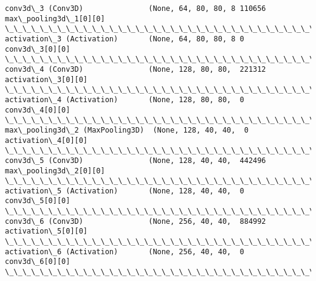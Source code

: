 \documentclass[11pt]{article}
\begin{document}
\begin{Verbatim}[commandchars=\\\{\}]
conv3d\_3 (Conv3D)               (None, 64, 80, 80, 8 110656      max\_pooling3d\_1[0][0]            
\_\_\_\_\_\_\_\_\_\_\_\_\_\_\_\_\_\_\_\_\_\_\_\_\_\_\_\_\_\_\_\_\_\_\_\_\_\_\_\_\_\_\_\_\_\_\_\_\_\_\_\_\_\_\_\_\_\_\_\_\_\_\_\_\_\_\_\_\_\_\_\_\_\_\_\_\_\_\_\_\_\_\_\_\_\_\_\_\_\_\_\_\_\_\_\_\_\_
activation\_3 (Activation)       (None, 64, 80, 80, 8 0           conv3d\_3[0][0]                   
\_\_\_\_\_\_\_\_\_\_\_\_\_\_\_\_\_\_\_\_\_\_\_\_\_\_\_\_\_\_\_\_\_\_\_\_\_\_\_\_\_\_\_\_\_\_\_\_\_\_\_\_\_\_\_\_\_\_\_\_\_\_\_\_\_\_\_\_\_\_\_\_\_\_\_\_\_\_\_\_\_\_\_\_\_\_\_\_\_\_\_\_\_\_\_\_\_\_
conv3d\_4 (Conv3D)               (None, 128, 80, 80,  221312      activation\_3[0][0]               
\_\_\_\_\_\_\_\_\_\_\_\_\_\_\_\_\_\_\_\_\_\_\_\_\_\_\_\_\_\_\_\_\_\_\_\_\_\_\_\_\_\_\_\_\_\_\_\_\_\_\_\_\_\_\_\_\_\_\_\_\_\_\_\_\_\_\_\_\_\_\_\_\_\_\_\_\_\_\_\_\_\_\_\_\_\_\_\_\_\_\_\_\_\_\_\_\_\_
activation\_4 (Activation)       (None, 128, 80, 80,  0           conv3d\_4[0][0]                   
\_\_\_\_\_\_\_\_\_\_\_\_\_\_\_\_\_\_\_\_\_\_\_\_\_\_\_\_\_\_\_\_\_\_\_\_\_\_\_\_\_\_\_\_\_\_\_\_\_\_\_\_\_\_\_\_\_\_\_\_\_\_\_\_\_\_\_\_\_\_\_\_\_\_\_\_\_\_\_\_\_\_\_\_\_\_\_\_\_\_\_\_\_\_\_\_\_\_
max\_pooling3d\_2 (MaxPooling3D)  (None, 128, 40, 40,  0           activation\_4[0][0]               
\_\_\_\_\_\_\_\_\_\_\_\_\_\_\_\_\_\_\_\_\_\_\_\_\_\_\_\_\_\_\_\_\_\_\_\_\_\_\_\_\_\_\_\_\_\_\_\_\_\_\_\_\_\_\_\_\_\_\_\_\_\_\_\_\_\_\_\_\_\_\_\_\_\_\_\_\_\_\_\_\_\_\_\_\_\_\_\_\_\_\_\_\_\_\_\_\_\_
conv3d\_5 (Conv3D)               (None, 128, 40, 40,  442496      max\_pooling3d\_2[0][0]            
\_\_\_\_\_\_\_\_\_\_\_\_\_\_\_\_\_\_\_\_\_\_\_\_\_\_\_\_\_\_\_\_\_\_\_\_\_\_\_\_\_\_\_\_\_\_\_\_\_\_\_\_\_\_\_\_\_\_\_\_\_\_\_\_\_\_\_\_\_\_\_\_\_\_\_\_\_\_\_\_\_\_\_\_\_\_\_\_\_\_\_\_\_\_\_\_\_\_
activation\_5 (Activation)       (None, 128, 40, 40,  0           conv3d\_5[0][0]                   
\_\_\_\_\_\_\_\_\_\_\_\_\_\_\_\_\_\_\_\_\_\_\_\_\_\_\_\_\_\_\_\_\_\_\_\_\_\_\_\_\_\_\_\_\_\_\_\_\_\_\_\_\_\_\_\_\_\_\_\_\_\_\_\_\_\_\_\_\_\_\_\_\_\_\_\_\_\_\_\_\_\_\_\_\_\_\_\_\_\_\_\_\_\_\_\_\_\_
conv3d\_6 (Conv3D)               (None, 256, 40, 40,  884992      activation\_5[0][0]               
\_\_\_\_\_\_\_\_\_\_\_\_\_\_\_\_\_\_\_\_\_\_\_\_\_\_\_\_\_\_\_\_\_\_\_\_\_\_\_\_\_\_\_\_\_\_\_\_\_\_\_\_\_\_\_\_\_\_\_\_\_\_\_\_\_\_\_\_\_\_\_\_\_\_\_\_\_\_\_\_\_\_\_\_\_\_\_\_\_\_\_\_\_\_\_\_\_\_
activation\_6 (Activation)       (None, 256, 40, 40,  0           conv3d\_6[0][0]                   
\_\_\_\_\_\_\_\_\_\_\_\_\_\_\_\_\_\_\_\_\_\_\_\_\_\_\_\_\_\_\_\_\_\_\_\_\_\_\_\_\_\_\_\_\_\_\_\_\_\_\_\_\_\_\_\_\_\_\_\_\_\_\_\_\_\_\_\_\_\_\_\_\_\_\_\_\_\_\_\_\_\_\_\_\_\_\_\_\_\_\_\_\_\_\_\_\_\_

\end{Verbatim}
\end{document}
